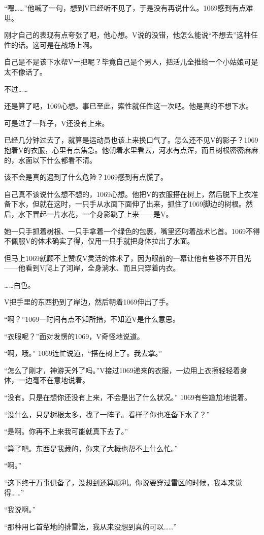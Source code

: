 “嘿……”他喊了一句，想到V已经听不见了，于是没有再说什么。1069感到有点难堪。

刚才自己的表现有点夸张了吧，他心想。V说的没错，他怎么能说“不想去”这种任性的话。这可是在战场上啊。

自己是不是该下水帮V一把呢？毕竟自己是个男人，把活儿全推给一个小姑娘可是太不像话了。

不过……

还是算了吧，1069心想。事已至此，索性就任性这一次吧。他是真的不想下水。

可是过了一阵子，V还没有上来。

已经几分钟过去了，就算是运动员也该上来换口气了。怎么还不见V的影子？1069抱着V的衣服，心里有点焦急。他朝着水里看去，河水有点浑，而且树根密密麻麻的，水面以下什么都看不清。

该不会是真的遇到了什么危险？1069感到有点慌了。

自己真不该说什么想不想的，1069心想。他把V的衣服搭在树上，然后脱下上衣准备下水，但就在这时，一只手从水面下面伸了出来，抓住了1069脚边的树根。然后，水下冒起一片水花，一个身影跳了上来——是V。

她一只手抓着树根、一只手拿着一个绿色的包裹，嘴里还叼着战术匕首。1069不得不佩服V的体术确实了得，仅用一只手就把身体拉出了水面。

但马上1069就顾不上赞叹V灵活的体术了，因为眼前的一幕让他有些移不开目光——他看到V爬上了河岸，全身淌水、而且只穿着内衣。

……白色。

V把手里的东西扔到了岸边，然后朝着1069伸出了手。

“啊？”1069一时间有点不知所措，不知道V是什么意思。

“衣服呢？”面对发愣的1069，V奇怪地说道。

“啊，哦。” 1069连忙说道，“搭在树上了。我去拿。”

“怎么了刚才，神游天外了吗。”V接过1069递来的衣服，一边用上衣擦轻轻着身体，一边毫不在意地说着。

“没有。只是在想你还没有上来，不会是出了什么状况。” 1069有些尴尬地说着。

“没什么，只是树根太多，找了一阵子。看样子你也准备下水了？”

“是啊。你再不上来我可能就真下去了。”

“算了吧。东西是我藏的，你来了大概也帮不上什么忙。”

“啊。”

“这下终于万事俱备了，没想到还算顺利。你说要穿过雷区的时候，我本来觉得……”

“我说啊。”

“那种用匕首犁地的排雷法，我从来没想到真的可以……”

